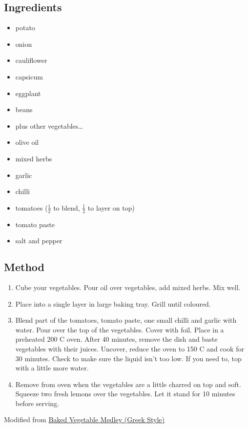 \documentclass[11pt,a4paper]{article}
\begin{document}
\subsection*{Ingredients}

\begin{multicols}{2}

\begin{itemize}
  \item potato
  \item onion
  \item cauliflower
  \item capsicum
  \item eggplant
  \item beans
  \item plus other vegetables\dots
\end{itemize}

    \columnbreak{}

\begin{itemize}
  \item olive oil
  \item mixed herbs
  \item garlic
  \item chilli
  \item tomatoes ($\frac{1}{2}$ to blend, $\frac{1}{2}$ to layer on top)
  \item tomato paste
  \item salt and pepper
\end{itemize}

\end{multicols}

\medskip

\subsection*{Method}

\begin{enumerate}
   \item Cube your vegetables.  Pour oil over vegetables, add mixed herbs.  Mix well.
   \item Place into a single layer in large baking tray.  Grill until coloured.
   \item Blend part of the tomatoes, tomato paste, one small chilli and garlic with water.  Pour over the top of the vegetables.  Cover with foil.  Place in a preheated 200\textdegree{} C oven.  After 40 minutes, remove the dish and baste vegetables with their juices.  Uncover, reduce the oven to 150\textdegree{} C and cook for 30 minutes.  Check to make sure the liquid isn't too low.  If you need to, top with a little more water.
   \item Remove from oven when the vegetables are a little charred on top and soft.  Squeeze two fresh lemons over the vegetables.  Let it stand for 10  minutes before serving.
\end{enumerate}

Modified from \href{https://www.artfrommytable.com/baked-vegetable-medley-greek-style/}{Baked Vegetable Medley (Greek Style)}
\end{document}
